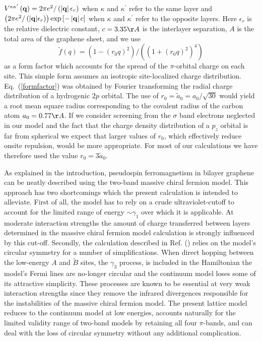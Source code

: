 \documentclass[twocolumn,prb,showpacs,preprintnumbers,amsmath,amssymb]{revtex4}
\begin{document}
$V^{\kappa \kappa^{\prime}} \left( {\bf q} \right) =  2 \pi e^2 / \left(  \left| \bf q \right|   \epsilon_r \right)  $
when $\kappa$ and $\kappa^{\prime}$ refer to the same layer and 
$\left( 2 \pi e^2 /\left( { \left| \bf q \right|}   \epsilon_r \right)  \right)  \exp{ \left[  - \left| {\bf q} \right|  c \right] } $
when $\kappa$ and $\kappa^{\prime}$ refer to the opposite layers.
Here $\epsilon_r$ is the relative dielectric constant, 
$c=3.35 \AA$ is the interlayer separation,
$A$ is the total area of the graphene sheet, and we use  
\begin{equation}
\widetilde{f}\left( q \right) = (1 -  \left(r_0 q\right)^2 ) / (  (1 + \left(r_0 q \right)^2 )^4  )
\label{formfactor}
\end{equation}
as a form factor which accounts for the spread of the $\pi$-orbital charge on each site.
This simple form assumes an isotropic site-localized charge distribution.
Eq.~(\ref{formfactor}) was obtained by Fourier transforming the radial charge distribution of a hydrogenic $2 p$ orbital. 
The use of $r_0 = \widetilde{a}_0 = a_0/ \sqrt{30}$ would yield a root mean square radius
corresponding to the covalent radius of the carbon atom $a_0 = 0.77 \AA$. 
If we consider screening from the $\sigma$ band electrons neglected in our model and 
the fact that the charge density distribution of a $p_z$ orbital is far from spherical
we expect that larger values of $r_0$, which effectively 
reduce onsite repulsion, would be more appropriate.
For most of our calculations we have therefore used the value $r_0 = 3 \widetilde{a}_0$.

As explained in the introduction, pseudospin ferromagnetism in bilayer graphene 
can be neatly described using the two-band massive chiral fermion model. 
This approach has two shortcomings which the present calculation is intended to 
alleviate.  First of all, the model has to rely on a crude ultraviolet-cutoff to
account for the limited range of energy $\sim \gamma_1$ over which 
it is applicable.  At moderate interaction strengths the amount of 
charge transferred between layers determined in the massive chiral 
fermion model calculation is strongly influenced by this cut-off. 
Secondly, the calculation described in Ref. () 
relies on the model's circular symmetry for a number of simplifications.
When direct hopping between the low-energy $A$ and $\tilde{B}$ sites, the 
$\gamma_3$ process, is included in the Hamiltonian the model's Fermi lines are 
no-longer circular and the continuum model loses some of its attractive simplicity.
\cite{trigonal1,trigonal2}
These processes are known to be essential at 
very weak interaction strengths since they remove the 
infrared divergences\cite{fanzhang,yang} responsible for the instabilities of the massive 
chiral fermion model.  
The present lattice model reduces to the continuum model
at low energies, accounts naturally for the limited validity range of two-band models by
retaining all four $\pi$-bands, and can deal with the loss of circular symmetry without 
any additional complication.  
\end{document}
